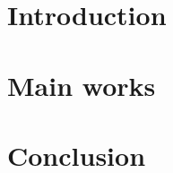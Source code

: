 \documentclass[ %
titlepage,numbers=noenddot,%
                headinclude,footinclude,cleardoublepage=empty,abstract=on,
                BCOR=5mm,paper=a4,fontsize=11pt
                ]{scrreprt}
\begin{document}
\raggedbottom
{} %
\pagestyle{plain}
% 

% 
\cleardoublepage
\cleardoublepage
\cleardoublepage
\cleardoublepage
\cleardoublepage
\pagestyle{scrheadings}

\clearscrheadfoot
\ohead{\rightmark}
\cfoot[\pagemark]{\pagemark}

\part{Introduction}\label{pt:intro}


\part{Main works}\label{pt:main}
% 




\cleardoublepage
\part{Conclusion}\label{pt:end}


%

\cleardoublepage
\end{document}
